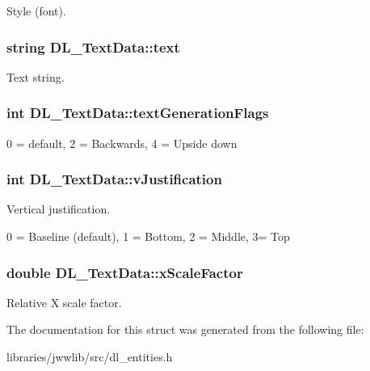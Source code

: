 Style (font). \hypertarget{structDL__TextData_a63a8f86f035fd8bd2471a24db80fd643}{
\subsubsection[{text}]{\setlength{\rightskip}{0pt plus 5cm}string D\-L\-\_\-\-Text\-Data\-::text}}\label{structDL__TextData_a63a8f86f035fd8bd2471a24db80fd643}
Text string. \hypertarget{structDL__TextData_af29798957eca4fcdaa57038b7c86d255}{
\subsubsection[{text\-Generation\-Flags}]{\setlength{\rightskip}{0pt plus 5cm}int D\-L\-\_\-\-Text\-Data\-::text\-Generation\-Flags}}\label{structDL__TextData_af29798957eca4fcdaa57038b7c86d255}
0 = default, 2 = Backwards, 4 = Upside down \hypertarget{structDL__TextData_a89f9827673fc4f735a47527d168ecb96}{
\subsubsection[{v\-Justification}]{\setlength{\rightskip}{0pt plus 5cm}int D\-L\-\_\-\-Text\-Data\-::v\-Justification}}\label{structDL__TextData_a89f9827673fc4f735a47527d168ecb96}
Vertical justification.

0 = Baseline (default), 1 = Bottom, 2 = Middle, 3= Top \hypertarget{structDL__TextData_a322e0cc0909794e957cd83811b629046}{
\subsubsection[{x\-Scale\-Factor}]{\setlength{\rightskip}{0pt plus 5cm}double D\-L\-\_\-\-Text\-Data\-::x\-Scale\-Factor}}\label{structDL__TextData_a322e0cc0909794e957cd83811b629046}
Relative X scale factor. 

The documentation for this struct was generated from the following file\-:\begin{DoxyCompactItemize}
\item 
libraries/jwwlib/src/dl\-\_\-entities.\-h\end{DoxyCompactItemize}
